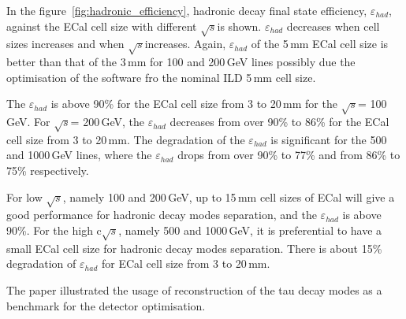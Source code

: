 \documentclass[a4paper,11pt]{article}
\newcommand{\rootS}{\ensuremath{\sqrt{s}}}
\begin{document}
In the figure~\ref{fig:hadronic_efficiency}, \PGt hadronic decay final state efficiency, $\varepsilon_{had}$, against the ECal cell size with different \rootS is shown. $\varepsilon_{had}$ decreases when cell sizes increases and when \rootS increases.  Again, $\varepsilon_{had}$ of the 5\,mm ECal cell size is better than that of the 3\,mm for 100 and 200\,GeV lines possibly due the optimisation of the software fro the nominal ILD 5\,mm cell size.

The $\varepsilon_{had}$ is above 90\% for the ECal cell size from 3 to 20\,mm for the \rootS = 100\,GeV. For \rootS = 200\,GeV, the $\varepsilon_{had}$ decreases from over 90\% to 86\% for the ECal cell size from 3 to 20\,mm. The degradation of the $\varepsilon_{had}$ is significant for the 500 and 1000\,GeV lines, where the $\varepsilon_{had}$ drops from over 90\% to 77\%  and from 86\% to 75\% respectively. 

For low \rootS, namely 100 and 200\,GeV, up to 15\,mm cell sizes of ECal will give a good performance for \PGt hadronic decay modes separation, and the $\varepsilon_{had}$ is above 90\%. For the high c\rootS, namely 500 and 1000\,GeV, it is preferential to have a small ECal cell size for \PGt hadronic decay modes separation. There is about 15\% degradation of $\varepsilon_{had}$ for ECal cell size from 3 to 20\,mm.


The paper illustrated the usage of reconstruction of the tau decay modes as a benchmark for the detector optimisation. 




\end{document}
